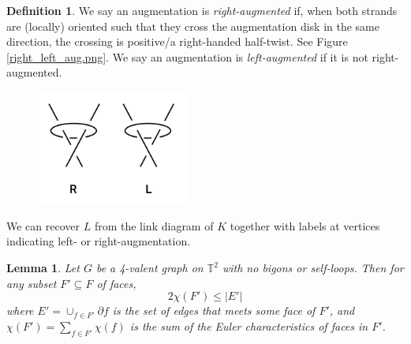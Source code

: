 \documentclass[11pt]{amsart}
\newcommand{\figref}[1]{Figure \ref{#1}}
\newcommand{\torus}{{\mathbb{T}^2}}
\newcommand{\del}{\partial}
\theoremstyle{plain}
\newtheorem{lemma}[theorem]{Lemma}
\theoremstyle{definition}
\newtheorem{define}[theorem]{Definition}
\begin{document}
\begin{define}
We say an augmentation is \emph{right-augmented} if, when both strands are
(locally) oriented such that they cross the augmentation disk in the same
direction, the crossing is positive/a right-handed half-twist.
See \figref{right_left_aug.png}.
We say an augmentation is \emph{left-augmented} if it is not right-augmented.
\begin{figure}
\label{f:right_left_aug}
\includegraphics[width=5cm]{more_pictures/right_left_aug.png}
\end{figure}
\end{define}

We can recover $L$ from the link diagram of $K$
together with labels at vertices indicating left- or right-augmentation.


\begin{lemma}
\label{l:2fe}
Let $G$ be a 4-valent graph on $\torus$ with no bigons or self-loops.
Then for any subset $F' \subseteq F$ of faces,
\[
	2\chi(F') \leq |E'|
\]
where $E' = \cup_{f \in F'} \del f$ is the set of edges
that meets some face of $F'$,
and $\chi(F') = \sum_{f\in F'} \chi(f)$ is the sum
of the Euler characteristics of faces in $F'$.
\end{lemma}
\end{document}
